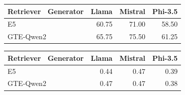 \begin{tabular}{lrrr}
\toprule
Retriever \ Generator & Llama & Mistral & Phi-3.5 \\
\midrule
E5 & 60.75 & 71.00 & 58.50 \\
GTE-Qwen2 & 65.75 & 75.50 & 61.25 \\
\bottomrule
\end{tabular}

\begin{tabular}{lrrr}
\toprule
Retriever \ Generator & Llama & Mistral & Phi-3.5 \\
\midrule
E5 & 0.44 & 0.47 & 0.39 \\
GTE-Qwen2 & 0.47 & 0.47 & 0.38 \\
\bottomrule
\end{tabular}